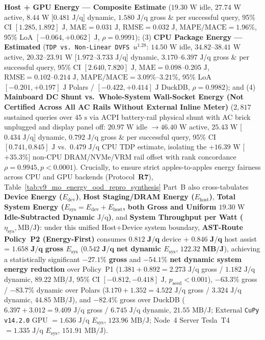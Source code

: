 \documentclass[10pt,a4paper]{article}
\begin{document}
\begin{enumerate}[leftmargin=1.5em,itemsep=0.8pt]
\textbf{Host + GPU Energy --- Composite Estimate} ($19.30\text{ W}$ idle, $27.74\text{ W}$ active, $8.44\text{ W}$ [$0.481\text{ J/q}$] dynamic, $1.580\text{ J/q}$ gross \& per successful query, 95\% CI $[1.285, 1.892]\text{ J}$, $\text{MAE}=0.031\text{ J}$, $\text{RMSE}=0.032\text{ J}$, $\text{MAPE/MACE}=1.96\%$, 95\% LoA $[-0.064,+0.062]\text{ J}$, $\rho=0.9991$); (3) \textbf{CPU Package Energy --- Estimated} (\texttt{TDP vs.\ Non-Linear DVFS $u^{1.28}$}: $14.50\text{ W}$ idle, $34.82\text{--}38.41\text{ W}$ active, $20.32\text{--}23.91\text{ W}$ [$1.972\text{--}3.733\text{ J/q}$] dynamic, $3.170\text{--}6.397\text{ J/q}$ gross \& per successful query, 95\% CI $[2.640, 7.820]\text{ J}$, $\text{MAE}=0.098\text{--}0.205\text{ J}$, $\text{RMSE}=0.102\text{--}0.214\text{ J}$, $\text{MAPE/MACE}=3.09\%\text{--}3.21\%$, 95\% LoA $[-0.201,+0.197]\text{ J}$ Polars / $[-0.422,+0.414]\text{ J}$ DuckDB, $\rho=0.9982$); and (4) \textbf{Mainboard DC Shunt vs.\ Whole-System Wall-Socket Energy (Not Certified Across All AC Rails Without External Inline Meter)} ($2{,}817$ sustained queries over $45\text{ s}$ via ACPI battery-rail physical shunt with AC brick unplugged and display panel off: $20.97\text{ W}$ idle $\rightarrow 46.40\text{ W}$ active, $25.43\text{ W}$ [$0.434\text{ J/q}$] dynamic, $0.792\text{ J/q}$ gross \& per successful query, 95\% CI $[0.741, 0.845]\text{ J}$ vs.\ $0.479\text{ J/q}$ CPU TDP estimate, isolating the $+16.39\text{ W}$ [$+35.3\%$] non-CPU DRAM/NVMe/VRM rail offset with rank concordance $\rho=0.9945, p<0.0001$). Crucially, to ensure strict apples-to-apples energy fairness across CPU and GPU backends (Protocol~\textbf{R7}), Table~\ref{tab:v9_mo_energy_ood_repro_synthesis} Part~B also cross-tabulates \textbf{Device Energy ($E_{\text{dev}}$)}, \textbf{Host Staging/DRAM Energy ($E_{\text{host}}$)}, \textbf{Total System Energy ($E_{\text{sys}} = E_{\text{dev}} + E_{\text{host}}$, both Gross and Uniform $19.30\text{ W}$ Idle-Subtracted Dynamic $\text{J/q}$)}, and \textbf{System Throughput per Watt ($\eta_{\text{sys}}, \text{MB/J}$)}: under this unified Host+Device system boundary, \textbf{AST-Route Policy~P2 (Energy-First)} consumes $\mathbf{0.812\text{ J/q}}$ device + $\mathbf{0.846\text{ J/q}}$ host assist = $\mathbf{1.658\text{ J/q}}$ \textbf{gross $E_{\text{sys}}$} ($\mathbf{0.542\text{ J/q}}$ \textbf{net dynamic $E_{\text{sys}}$}, $\mathbf{122.32\text{ MB/J}}$), achieving a statistically significant $\mathbf{-27.1\%}$ \textbf{gross} and $\mathbf{-54.1\%}$ \textbf{net dynamic system energy reduction} over Policy~P1 ($1.381 + 0.892 = 2.273\text{ J/q}$ gross / $1.182\text{ J/q}$ dynamic, $89.22\text{ MB/J}$, 95\% CI $[-0.812,-0.418]\text{ J}$, $p_{\text{seed}}<0.001$), $\mathbf{-63.3\%}$ gross / $\mathbf{-83.7\%}$ dynamic over Polars ($3.170 + 1.352 = 4.522\text{ J/q}$ gross / $3.324\text{ J/q}$ dynamic, $44.85\text{ MB/J}$), and $\mathbf{-82.4\%}$ gross over DuckDB ($6.397 + 3.012 = 9.409\text{ J/q}$ gross / $6.745\text{ J/q}$ dynamic, $21.55\text{ MB/J}$; External \texttt{CuPy v14.2.0} GPU $= 1.636\text{ J/q}$ $E_{\text{sys}}$, $123.96\text{ MB/J}$; Node~4 Server Tesla~T4 $= 1.335\text{ J/q}$ $E_{\text{sys}}$, $151.91\text{ MB/J}$).

\end{enumerate}
\end{document}
